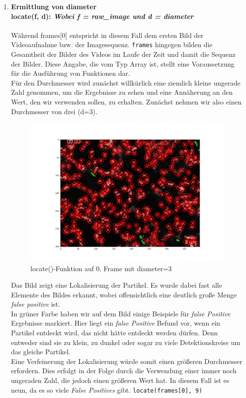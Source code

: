 	\begin{enumerate}
    			\item {\large \textbf{Ermittlung von diameter}}\\
    			\textbf{locate(f, d): \textit{Wobei f = raw\_image und d = diameter}} \\ \\
    			 Während frames[0] entspricht in diesem Fall dem ersten Bild der Videoaufnahme bzw. der Imagesequenz. \texttt{frames} hingegen bilden die Gesamtheit der Bilder des Videos im Laufe der Zeit und damit die Sequenz der Bilder.  Diese Angabe, die vom Typ Array ist, stellt eine Voraussetzung für die Ausführung von Funktionen dar. \\
    			 Für den Durchmesser wird zunächst willkürlich eine ziemlich kleine ungerade Zahl genommen, um die Ergebnisse zu sehen und eine Annäherung an den Wert, den wir verwenden sollen, zu erhalten. Zunächst nehmen wir also einen Durchmesser von drei (d=3).  
    			 
\begin{figure}[H]
    \centering
    \includegraphics[scale=0.35]{Grafiken/trackpyBilder/locate(f0, diameter=3).png}
    \caption{locate()-Funktion auf 0. Frame mit diameter=3}
    \label{fig:kap3_d=3}
\end{figure} 

Das Bild zeigt eine Lokalisierung der Partikel. Es wurde dabei fast alle Elemente des Bildes erkannt, wobei offensichtlich eine deutlich große Menge \textit{\gls{false positive}} ist.\\
In grüner Farbe haben wir auf dem Bild einige Beispiele für \textit{false Positive} Ergebnisse markiert. 
Hier liegt ein \textit{false Positive} Befund vor, wenn ein Partikel entdeckt wird, das nicht hätte entdeckt werden dürfen. Denn entweder sind sie zu klein, zu dunkel oder sogar zu viele Detektionskreise um das gleiche Partikel.  
\\
Eine Verfeinerung der Lokalisierung würde somit einen größeren Durchmesser erfordern. Dies erfolgt in der Folge durch die Verwendung einer immer noch ungeraden Zahl, die jedoch einen größeren Wert hat. In diesem Fall ist es neun, da es so viele \textit{False Positives} gibt. 
\texttt{locate(frames[0], 9)}


\end{enumerate}
